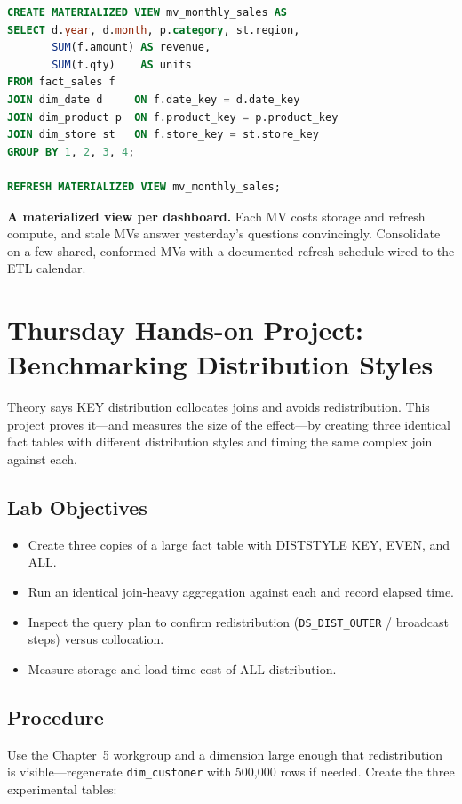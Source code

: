 \begin{lstlisting}[language=SQL,caption={Materialized view for a repeated month-end aggregation.},label={lst:ch6-mv}]
CREATE MATERIALIZED VIEW mv_monthly_sales AS
SELECT d.year, d.month, p.category, st.region,
       SUM(f.amount) AS revenue,
       SUM(f.qty)    AS units
FROM fact_sales f
JOIN dim_date d     ON f.date_key = d.date_key
JOIN dim_product p  ON f.product_key = p.product_key
JOIN dim_store st   ON f.store_key = st.store_key
GROUP BY 1, 2, 3, 4;

REFRESH MATERIALIZED VIEW mv_monthly_sales;
\end{lstlisting}

\begin{pitfall}
\textbf{A materialized view per dashboard.} Each MV costs storage and refresh compute, and stale MVs answer yesterday's questions convincingly. Consolidate on a few shared, conformed MVs with a documented refresh schedule wired to the ETL calendar.
\end{pitfall}

\section{Thursday Hands-on Project: Benchmarking Distribution Styles}
Theory says KEY distribution collocates joins and avoids redistribution. This project proves it---and measures the size of the effect---by creating three identical fact tables with different distribution styles and timing the same complex join against each.

\subsection*{Lab Objectives}
\begin{itemize}
    \item Create three copies of a large fact table with DISTSTYLE KEY, EVEN, and ALL.
    \item Run an identical join-heavy aggregation against each and record elapsed time.
    \item Inspect the query plan to confirm redistribution (\texttt{DS\_DIST\_OUTER} / broadcast steps) versus collocation.
    \item Measure storage and load-time cost of ALL distribution.
\end{itemize}

\subsection*{Procedure}
Use the Chapter~5 workgroup and a dimension large enough that redistribution is visible---regenerate \texttt{dim\_customer} with 500{,}000 rows if needed. Create the three experimental tables:

